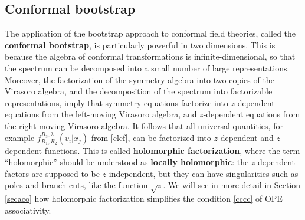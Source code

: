 \documentclass[12pt, a4paper, notitlepage, twoside]{report}
\numberwithin{equation}{section}
\theoremstyle{break}
\begin{document}
\subsection{Conformal bootstrap}

The application of the bootstrap approach to conformal field theories, called the \textbf{conformal bootstrap}, 
is particularly powerful in two dimensions.
This is because the algebra of conformal transformations is infinite-dimensional, 
so that the spectrum can be decomposed into a small number of large representations.
Moreover, the factorization of the symmetry algebra into two copies of the Virasoro algebra, and the decomposition of the spectrum into factorizable representations,
imply that symmetry equations factorize into $z$-dependent equations from the left-moving Virasoro algebra, and $\bar{z}$-dependent equations from the right-moving Virasoro algebra.
It follows that all universal quantities, for example $f_{R_1,R_2}^{R_3,\lambda}(v_i|x_j)$ from \eqref{clcf}, can be factorized into $z$-dependent and $\bar{z}$-dependent functions. 
This is called \textbf{\boldmath holomorphic factorization}, where the term ``holomorphic''
should be understood as \textbf{\boldmath locally holomorphic}: the $z$-dependent factors are supposed to be $\bar{z}$-independent, but they can have singularities such as poles and branch cuts, like the function $\sqrt{z}$.
We will see in more detail in Section \ref{secaco} how holomorphic factorization simplifies the condition \eqref{cccc} of OPE associativity.
\end{document}
